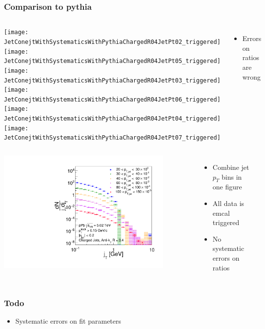 \documentclass{beamer}
\begin{document}
\begin{frame}
\frametitle{Comparison to pythia}
\begin{columns}
\texttt{[image: JetConejtWithSystematicsWithPythiaChargedR04JetPt02\_triggered]} \\
\texttt{[image: JetConejtWithSystematicsWithPythiaChargedR04JetPt05\_triggered]} \\
\texttt{[image: JetConejtWithSystematicsWithPythiaChargedR04JetPt03\_triggered]} \\
\texttt{[image: JetConejtWithSystematicsWithPythiaChargedR04JetPt06\_triggered]} \\
\texttt{[image: JetConejtWithSystematicsWithPythiaChargedR04JetPt04\_triggered]} \\
\texttt{[image: JetConejtWithSystematicsWithPythiaChargedR04JetPt07\_triggered]} \\
\begin{itemize}
\item Errors on ratios are wrong
\end{itemize}
\end{columns}
\end{frame}

\begin{frame}
\begin{columns}
\includegraphics[width=0.85\textwidth]{JetConejtWithSystematicsChargedR04_triggered} \\
\begin{itemize}
\item Combine jet $p_T$ bins in one figure
\item All data is emcal triggered
\item No systematic errors on ratios
\end{itemize}
\end{columns}
\end{frame}

\begin{frame}
\frametitle{Todo}
\begin{itemize}
\item Systematic errors on fit parameters
\end{itemize}
\end{frame}
\end{document}
